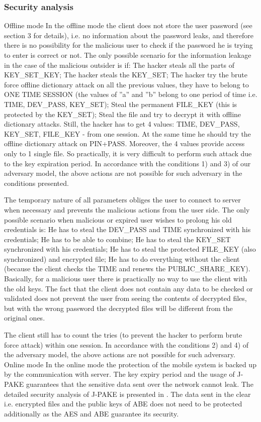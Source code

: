 \documentclass[twocolumn]{svjour3}          %
\begin{document}
\subsubsection{Security analysis}
\label{sec_sec_analysis}
Offline mode
In the offline mode the client does not store the user password (see section 3 for details), i.e. no information about the password leaks, and therefore there is no possibility for the malicious user to check if the password he is trying to enter is correct or not. The only possible scenario for the information leakage in the case of the malicious outsider is if:
The hacker steals all the parts of KEY\_SET\_KEY;
The hacker steals the KEY\_SET;
The hacker try the brute force offline dictionary attack on all the previous values, they have to belong to ONE TIME SESSION (the values of ”a” and ”b” belong to one period of time i.e. TIME, DEV\_PASS, KEY\_SET);
Steal the permanent FILE\_KEY (this is protected by the KEY\_SET);
Steal the file and try to decrypt it with offline dictionary attacks.
        Still, the hacker has to get 4 values: TIME, DEV\_PASS, KEY\_SET, FILE\_KEY - from one session. At the same time he should try the offline dictionary attack on PIN+PASS. Moreover, the 4 values provide access only to 1 single file. So practically, it is very difficult to perform such attack due to the key expiration period. In accordance with the conditions 1) and 3) of our adversary model, the above actions are not possible for such adversary in the conditions presented.

The temporary nature of all parameters obliges the user to connect to server when necessary and prevents the malicious actions from the user side. The only possible scenario when malicious or expired user wishes to prolong his old credentials is:
He has to steal the DEV\_PASS and TIME synchronized with his credentials;
He has to be able to combine;
He has to steal the KEY\_SET synchronized with his credentials;
He has to steal the protected FILE\_KEY (also synchronized) and encrypted file;
He has to do everything without the client (because the client checks the TIME and renews the PUBLIC\_SHARE\_KEY).
Basically, for a malicious user there is practically no way to use the client with the old keys. The fact that the client does not contain any data to be checked or validated does not prevent the user from seeing the contents of decrypted files, but with the wrong password the decrypted files will be different from the original ones.

The client still has to count the tries (to prevent the hacker to perform brute force attack) within one session. In accordance with the conditions 2) and 4) of the adversary model, the above actions are not possible for such adversary.
Online mode
In the online mode the protection of the mobile system is backed up by the communication with server. The key expiry period and the usage of J-PAKE \cite{hao2010j,hao2008password} guarantees that the sensitive data sent over the network cannot leak. The detailed security analysis of J-PAKE is presented in \cite{toorani2014security}. The data sent in the clear i.e. encrypted files and the public keys of ABE does not need to be protected additionally as the AES and ABE guarantee its security.
\end{document}
